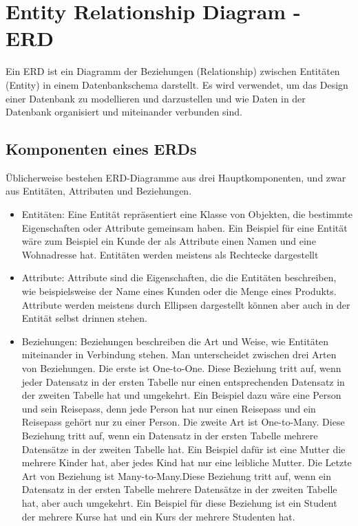     \section{Entity Relationship Diagram - ERD}

    Ein ERD ist ein Diagramm der Beziehungen (Relationship) zwischen Entitäten (Entity) in einem Datenbankschema darstellt. 
    Es wird verwendet, um das Design einer Datenbank zu modellieren und darzustellen und wie Daten in der Datenbank organisiert und miteinander verbunden sind.

    \pagebreak

    \subsection{Komponenten eines ERDs}

    Üblicherweise bestehen ERD-Diagramme aus drei Hauptkomponenten, und zwar aus Entitäten, Attributen und Beziehungen.

    \begin{itemize}
        \item Entitäten: Eine Entität repräsentiert eine Klasse von Objekten, die bestimmte Eigenschaften oder Attribute gemeinsam haben. Ein Beispiel für eine Entität wäre zum Beispiel ein Kunde der als Attribute einen Namen und eine Wohnadresse hat. Entitäten werden meistens als Rechtecke dargestellt
        \item Attribute: Attribute sind die Eigenschaften, die die Entitäten beschreiben, wie beispielsweise der Name eines Kunden oder die Menge eines Produkts. Attribute werden meistens durch Ellipsen dargestellt können aber auch in der Entität selbst drinnen stehen.
        \item Beziehungen: Beziehungen beschreiben die Art und Weise, wie Entitäten miteinander in Verbindung stehen. 
        Man unterscheidet zwischen drei Arten von Beziehungen. Die erste ist One-to-One.  Diese Beziehung tritt auf, wenn jeder Datensatz in der ersten Tabelle nur einen entsprechenden Datensatz in der zweiten Tabelle hat und umgekehrt. Ein Beispiel dazu wäre eine Person und sein Reisepass, denn jede Person hat nur einen Reisepass und ein Reisepass gehört nur zu einer Person.
        Die zweite Art ist One-to-Many. Diese Beziehung tritt auf, wenn ein Datensatz in der ersten Tabelle mehrere Datensätze in der zweiten Tabelle hat. Ein Beispiel dafür ist eine Mutter die mehrere Kinder hat, aber jedes Kind hat nur eine leibliche Mutter.
        Die Letzte Art von Beziehung ist Many-to-Many.Diese Beziehung tritt auf, wenn ein Datensatz in der ersten Tabelle mehrere Datensätze in der zweiten Tabelle hat, aber auch umgekehrt. Ein Beispiel für diese Beziehung ist ein Student der mehrere Kurse hat und ein Kurs der mehrere Studenten hat.

        \end{itemize}

